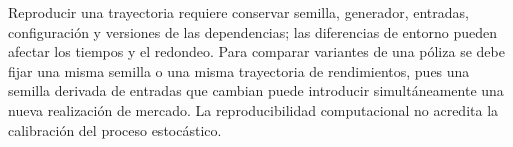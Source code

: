 Reproducir una trayectoria requiere conservar semilla, generador, entradas,
configuración y versiones de las dependencias; las diferencias de entorno pueden
afectar los tiempos y el redondeo. Para comparar variantes de una póliza se debe
fijar una misma semilla o una misma trayectoria de rendimientos, pues una semilla
derivada de entradas que cambian puede introducir simultáneamente una nueva
realización de mercado. La reproducibilidad computacional no acredita la
calibración del proceso estocástico.
